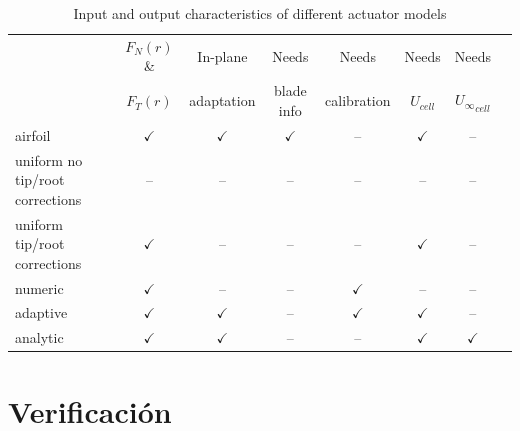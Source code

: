 \begin{table}
    \caption{Input and output characteristics of different actuator models}
    \label{table1}

    {\small
    \begin{tabular}{l|cc|ccccc|}
    \toprule
                                        &  $F_N(r)$  \& & In-plane      & Needs         & Needs         & Needs         & Needs                 \\
                                        &  $F_T(r)$     & adaptation    & blade info    & calibration   & $U_{cell}$    & ${U_\infty}_{cell}$   \\
    \midrule
    airfoil                             & $\checkmark$  & $\checkmark$  & $\checkmark$  & --            & $\checkmark$  & --                    \\
    uniform {\small no tip/root corrections}     & --            & --            & --            & --            & --            & --                    \\
    uniform {\small tip/root corrections}        & $\checkmark$  & --            & --            & --            & $\checkmark$  & --                    \\
    numeric                             & $\checkmark$  & --            & --            & $\checkmark$  & --            & --                    \\
    adaptive                            & $\checkmark$  & $\checkmark$  & --            & $\checkmark$  & $\checkmark$  & --                    \\
    analytic                            & $\checkmark$  & $\checkmark$  & --            & --            & $\checkmark$  & $\checkmark$          \\
    \bottomrule
    \end{tabular}
    }

\end{table}







\section{Verificación}

